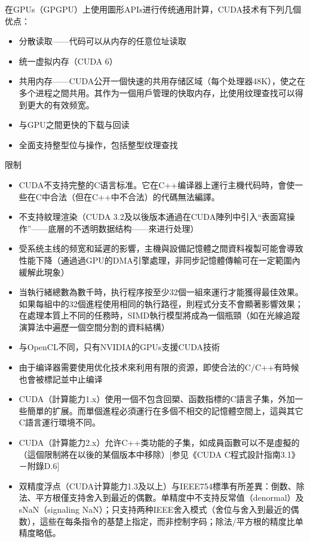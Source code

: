 \documentclass[12pt,a4paper]{article}
\begin{document}
在GPUs（GPGPU）上使用圖形APIs进行传统通用計算，CUDA技术有下列几個优点：
\begin{itemize}
  \item 分散读取——代码可以从内存的任意位址读取
  \item 统一虚拟内存（CUDA 6）
  \item 共用内存——CUDA公开一個快速的共用存储区域（每个处理器48K），使之在多个进程之間共用。其作为一個用戶管理的快取内存，比使用纹理查找可以得到更大的有效频宽。
  \item 与GPU之間更快的下载与回读
  \item 全面支持整型位与操作，包括整型纹理查找
\end{itemize}



限制
\begin{itemize}
  \item CUDA不支持完整的C语言标准。它在C++编译器上運行主機代码時，會使一些在C中合法（但在C++中不合法）的代碼無法編譯。
  \item 不支持紋理渲染（CUDA 3.2及以後版本通過在CUDA陣列中引入“表面寫操作”——底層的不透明数据结构——來进行处理）
  \item 受系统主线的频宽和延遲的影響，主機與設備記憶體之間資料複製可能會導致性能下降（通過過GPU的DMA引擎處理，非同步記憶體傳輸可在一定範圍內緩解此現象）
  \item 当執行緒總數為數千時，执行程序按至少32個一組來運行才能獲得最佳效果。如果每組中的32個進程使用相同的執行路徑，則程式分支不會顯著影響效果；在處理本質上不同的任務時，SIMD執行模型將成為一個瓶頸（如在光線追蹤演算法中遍歷一個空間分割的資料結構）
  \item 与OpenCL不同，只有NVIDIA的GPUs支援CUDA技術
  \item 由于编译器需要使用优化技术來利用有限的资源，即使合法的C/C++有時候也會被標記並中止编译
  \item CUDA（計算能力1.x）使用一個不包含回槊、函数指標的C語言子集，外加一些簡單的扩展。而單個進程必須運行在多個不相交的記憶體空間上，這與其它C語言運行環境不同。
  \item CUDA（計算能力2.x）允许C++类功能的子集，如成員函數可以不是虛擬的（這個限制將在以後的某個版本中移除）[参见《CUDA C程式設計指南3.1》－附錄D.6]
  \item 双精度浮点（CUDA计算能力1.3及以上）与IEEE754標準有所差異：倒数、除法、平方根僅支持舍入到最近的偶數。单精度中不支持反常值（denormal）及sNaN（signaling NaN）；只支持两种IEEE舍入模式（舍位与舍入到最近的偶数），這些在每条指令的基楚上指定，而非控制字码；除法/平方根的精度比单精度略低。
\end{itemize}
\end{document}
